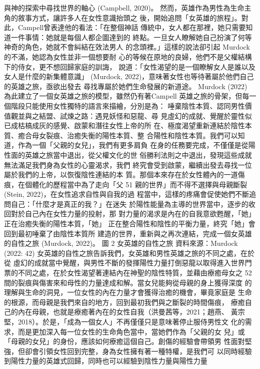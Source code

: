 與神的探索中尋找世界的軸心 (Campbell, 2020)。 
然而，英雄作為男性為生命主角的敘事方式，讓許多人在女性意識抬頭之
後，開始追問「女英雄的旅程」。對此，Campell曾表達他的看法：「在整個神話
傳統中，女人都在那裡，她只需要知道一件事情：她就是每個人都企圖達到的
終點。一旦女人瞭解她自己扮演了何等神奇的角色，她就不會糾結在效法男人
的念頭裡。」這樣的說法卻引起 Murdock 的不滿，她認為女性並非一個想要耐
心的等候在原地的良婦，他們不是父權結構下的侍女，更不想回歸家庭的訓誨，
說道：「女性渴望的是一個瞭解女人是誰以及女人是什麼的新集體意識」
(Murdock, 2022)，意味著女性也等待著屬於他們自己的英雄之旅，亟欲出發去
尋找專屬於她們生命發展的新道途。 
Murdock (2022) 為此建立了一個女英雄之旅的模型，雖然仍有著Campell
英雄之旅的骨架，但每一個階段只能使用女性獨特的語言來描繪，分別是為：
唾棄陰性本質、認同男性價值觀並與之結盟、試煉之路：遇見妖怪和惡龍、尋
見虛幻的成就、覺醒於靈性似已成枯槁成灰的感覺、啟蒙和潛往女性上帝的所
在、極度渴望重新連結於陰性本質、癒合母女裂痕、治癒失衡的陽性本質、整
合陽性和陰性本質。我們可以知道，作為一個「父親的女兒」，我們有更多肩負
在身的任務要完成，不僅僅是從陽性面的英雄之旅當中退出，從父權文化的世
俗勝利法則之中退出，發現這些成就無法滿足我們身為女性的心靈渴求，我們
終究會受到啟蒙，繼續出發去尋找一位屬於我們的上帝，以恢復陰性連結的本
質。那個本來存在於女性體內的一道傷痕，在個體化的歷程當中為了走向「父
51 
親的世界」而不得不選擇與母親斷裂 (Stein, 2022)，在女性追求自性與自我的過
程當中，這樣的疼痛會促使她們不斷追問自己：「什麼才是真正的我？」在迷失
於陽性能量為主導的世界當中，逐步的收回對於自己內在女性力量的投射，那
對力量的渴求是內在的自我意欲甦醒，「她」正在治癒失衡的陽性本質，「她」
正在整合陽性和陰性的平衡力量，終究「她」會回到最初唾棄了由陰性本質所
建造的世界，重新與之再次連結，完成一個女英雄的自性之旅 (Murdock, 2022)。 
圖 2  
女英雄的自性之旅 
資料來源：Murdock (2022: 42) 
女英雄的自性之旅告訴我們，女英雄和男性英雄之旅的不同之處，在於從
虛幻的成就當中覺醒，與男性不斷的發揮陽性力量打倒惡龍以取得進入世界門
票的不同之處，在於女性渴望著連結內在神聖的陰性特質，並藉由療癒母女之
52 
間的裂痕與傷害來和母性的力量達成和解。當女兒能夠從母親的身上獲得深度
的理解與生命的洞見，一位女性的內在力量才會獲得治癒的機會，畢竟家庭是
生命的根源，而母親是我們來自的地方，回到最初我們與之斷裂的時間傷痕，
療癒自己的內在母親，也就是療癒著內在的女性自我（洪曼茜等，2021；趙燕、
黃宗堅，2018）。於是，「成為一個女人」不再僅僅只是意味著停止服侍男性文
化的需求，而是更加深入每一位女性的生命角色當中，當她們作為「父親的女
兒」或「母親的女兒」的身份，應該如何療癒這個自己。創傷的經驗會帶領男
性面對堅強，但卻會引領女性回到完整，身為女性擁有著一種特權，是我們可
以同時經驗到陽性力量的英雄式回歸，同時也可以經驗到陰性力量與陽性力量
